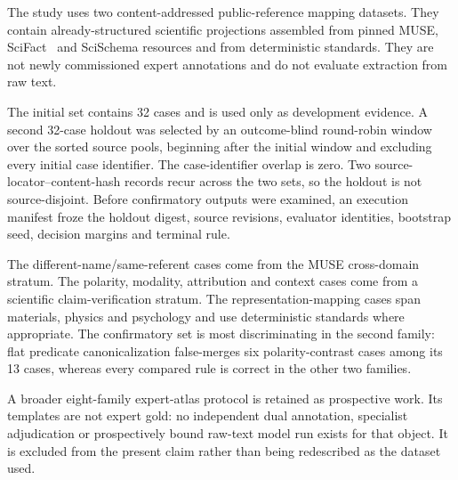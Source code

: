 The study uses two content-addressed public-reference mapping datasets. They
contain already-structured scientific projections assembled from pinned MUSE,
SciFact~\cite{wadden2020scifact} and SciSchema resources and from deterministic standards. They are not
newly commissioned expert annotations and do not evaluate extraction from raw
text.

The initial set contains 32 cases and is used only as development evidence. A
second 32-case holdout was selected by an outcome-blind round-robin window over
the sorted source pools, beginning after the initial window and excluding every
initial case identifier. The case-identifier overlap is zero. Two
source-locator--content-hash records recur across the two sets, so the holdout
is not source-disjoint. Before confirmatory outputs were examined, an execution
manifest froze the holdout digest, source revisions,
evaluator identities, bootstrap seed, decision margins and terminal rule.



The different-name/same-referent cases come from the MUSE cross-domain stratum.
The polarity, modality, attribution and context cases come from a scientific
claim-verification stratum. The representation-mapping cases span materials,
physics and psychology and use deterministic standards where appropriate. The
confirmatory set is most discriminating in the second family: flat predicate
canonicalization false-merges six polarity-contrast cases among its 13 cases,
whereas every compared rule is correct in the other two families.

A broader eight-family expert-atlas protocol is retained as prospective work.
Its templates are not expert gold: no independent dual annotation, specialist
adjudication or prospectively bound raw-text model run exists for that object.
It is excluded from the present claim rather than being redescribed as the
dataset used.
\endinput

